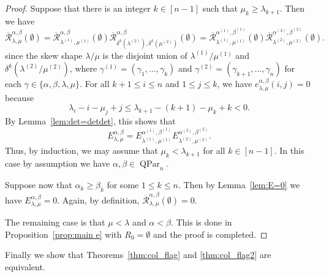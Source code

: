 \documentclass[12pt]{amsart}
\numberwithin{equation}{section}
\theoremstyle{definition}
\newcommand\QPar{\operatorname{QPar}}
\newcommand\lm{{\lambda/\mu}}
\newcommand\R{\mathcal{R}}
\newcommand\oR{\overline{\R}}
\begin{document}
\begin{proof}
  Suppose that there is an integer $k\in[n-1]$ such that $\mu_k\ge
  \lambda_{k+1}$. Then we have
  \[
    \oR_{\lambda,\mu}^{\alpha,\beta}(\emptyset) =
    \oR_{\lambda^{(1)},\mu^{(1)}}^{\alpha,\beta}(\emptyset)
    \oR_{\delta^k(\lambda^{(2)}),\delta^k(\mu^{(2)})}^{\alpha,\beta}(\emptyset)=
    \oR_{\lambda^{(1)},\mu^{(1)}}^{\alpha^{(1)},\beta^{(1)}}(\emptyset)
    \oR_{\lambda^{(2)},\mu^{(2)}}^{\alpha^{(2)},\beta^{(2)}}(\emptyset).
  \]
  since the skew shape $\lm$ is the disjoint union of $\lambda^{(1)}/\mu^{(1)}$
  and $\delta^k(\lambda^{(2)}/\mu^{(2)})$, where $\gamma^{(1)}=(\gamma_1,\dots,\gamma_k)$
  and $\gamma^{(2)}=(\gamma_{k+1},\dots,\gamma_n)$ for each
  $\gamma\in\{\alpha,\beta,\lambda,\mu\}$.
  For all $k+1\le i\le n$ and $1\le j\le k$, we have
  $e^{\alpha,\beta}_{\lambda,\mu}(i,j)=0$ because
 \[
    \lambda_i-i-\mu_j+j \le \lambda_{k+1}-(k+1)-\mu_k+k <0.
  \]
  By Lemma~\ref{lem:det=detdet}, this shows that
  \[
    E_{\lambda,\mu}^{\alpha,\beta} = E_{\lambda^{(1)},\mu^{(1)}}^{\alpha^{(1)},\beta^{(1)}}
    E_{\lambda^{(2)},\mu^{(2)}}^{\alpha^{(2)},\beta^{(2)}}.
  \]
  Thus, by induction, we may assume that $\mu_k<\lambda_{k+1}$ for all $k\in[n-1]$. In
  this case by assumption we have $\alpha,\beta\in\QPar_n$.

  Suppose now that $\alpha_k\ge\beta_k$ for some $1\le k\le n$. Then by
  Lemma~\ref{lem:E=0} we have $E_{\lambda,\mu}^{\alpha,\beta}=0$. Again, by
  definition, $\oR_{\lambda,\mu}^{\alpha,\beta}(\emptyset)=0$.

  The remaining case is that $\mu<\lambda$ and $\alpha<\beta$. This is done in
  Proposition~\ref{prop:main e} with $R_0=\emptyset$ and the proof is completed.
\end{proof}


Finally we show that Theorems~\ref{thm:col_flag} and \ref{thm:col_flag2} are equivalent.
\end{document}

